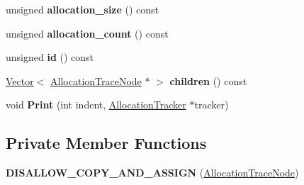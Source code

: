 \begin{DoxyCompactItemize}
\item 
unsigned {\bfseries allocation\+\_\+size} () const \hypertarget{classv8_1_1internal_1_1_allocation_trace_node_aaecc079598de291e9411b0b1143338bb}{}\label{classv8_1_1internal_1_1_allocation_trace_node_aaecc079598de291e9411b0b1143338bb}

\item 
unsigned {\bfseries allocation\+\_\+count} () const \hypertarget{classv8_1_1internal_1_1_allocation_trace_node_a2a31df2800608396686f67576477c648}{}\label{classv8_1_1internal_1_1_allocation_trace_node_a2a31df2800608396686f67576477c648}

\item 
unsigned {\bfseries id} () const \hypertarget{classv8_1_1internal_1_1_allocation_trace_node_a9f11563e9cbd3d46a0bd9eee2d8e0f3c}{}\label{classv8_1_1internal_1_1_allocation_trace_node_a9f11563e9cbd3d46a0bd9eee2d8e0f3c}

\item 
\hyperlink{classv8_1_1internal_1_1_vector}{Vector}$<$ \hyperlink{classv8_1_1internal_1_1_allocation_trace_node}{Allocation\+Trace\+Node} $\ast$ $>$ {\bfseries children} () const \hypertarget{classv8_1_1internal_1_1_allocation_trace_node_a81a9b60b273378fff6eee02960e44bea}{}\label{classv8_1_1internal_1_1_allocation_trace_node_a81a9b60b273378fff6eee02960e44bea}

\item 
void {\bfseries Print} (int indent, \hyperlink{classv8_1_1internal_1_1_allocation_tracker}{Allocation\+Tracker} $\ast$tracker)\hypertarget{classv8_1_1internal_1_1_allocation_trace_node_acfba1229f80910c5746758f8afdff7af}{}\label{classv8_1_1internal_1_1_allocation_trace_node_acfba1229f80910c5746758f8afdff7af}

\end{DoxyCompactItemize}
\subsection*{Private Member Functions}
\begin{DoxyCompactItemize}
\item 
{\bfseries D\+I\+S\+A\+L\+L\+O\+W\+\_\+\+C\+O\+P\+Y\+\_\+\+A\+N\+D\+\_\+\+A\+S\+S\+I\+GN} (\hyperlink{classv8_1_1internal_1_1_allocation_trace_node}{Allocation\+Trace\+Node})\hypertarget{classv8_1_1internal_1_1_allocation_trace_node_a41b0dffe34b9d338d359a5a60d53f6a7}{}\label{classv8_1_1internal_1_1_allocation_trace_node_a41b0dffe34b9d338d359a5a60d53f6a7}

\end{DoxyCompactItemize}
